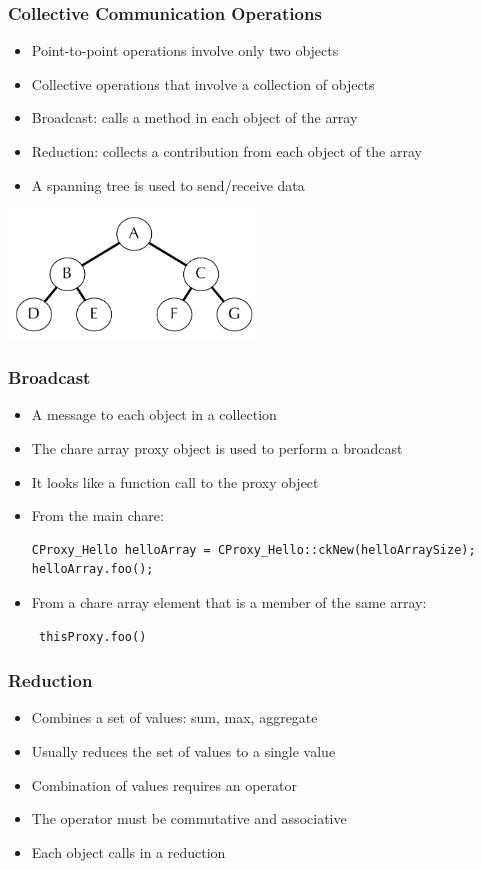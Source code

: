 \begin{frame}[fragile]
  \frametitle{Collective Communication Operations}
  \begin{itemize}
    \item Point-to-point operations involve only two objects
    \item Collective operations that involve a collection of objects
    \item Broadcast: calls a method in each object of the array
    \item Reduction: collects a contribution from each object of the array
    \item A spanning tree is used to send/receive data
  \end{itemize}
    \begin{center} \includegraphics[width=0.5\textwidth]{figures/spanningTree.pdf} \end{center}
\end{frame}


\begin{frame}[fragile]
  \frametitle{Broadcast}
  \begin{itemize}
    \item A message to each object in a collection
    \item The chare array proxy object is used to perform a broadcast
    \item It looks like a function call to the proxy object
    \item From the main chare:
    \begin{lstlisting}
CProxy_Hello helloArray = CProxy_Hello::ckNew(helloArraySize);
helloArray.foo();
    \end{lstlisting}
    \item From a chare array element that is a member of the same array:
     \begin{lstlisting}
 thisProxy.foo()
    \end{lstlisting}
  \end{itemize}
\end{frame}

\begin{frame}[fragile]
  \frametitle{Reduction}
  \begin{itemize}
  \item Combines a set of values: sum, max, aggregate
  \item Usually reduces the set of values to a single value
  \item Combination of values requires an operator
  \item The operator must be commutative and associative
  \item Each object calls  in a reduction
  \end{itemize}
\end{frame}

